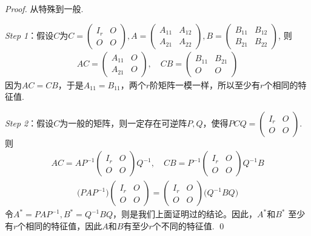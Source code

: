 \begin{proof}
	从特殊到一般.

	\emph{Step 1}：假设$C$为$C=\begin{pmatrix}
		I_r & O \\
		O & O
	\end{pmatrix}, A=\begin{pmatrix}
		A_{11} & A_{12} \\
		A_{21} & A_{22}
	\end{pmatrix}, B=\begin{pmatrix}
		B_{11} & B_{12} \\
		B_{21} & B_{22}
	\end{pmatrix}$,
	则
	\begin{align*}
	AC = \begin{pmatrix}
		A_{11} & O \\
		A_{21} & O
	\end{pmatrix}, \quad CB = \begin{pmatrix}
		B_{11} & B_{21} \\
		O & O
	\end{pmatrix}
	\end{align*}
	因为$AC=CB$，于是$A_{11} = B_{11}$，两个$r$阶矩阵一模一样，所以至少有$r$个相同的特征值.

	\emph{Step 2}：假设$C$为一般的矩阵，则一定存在可逆阵$P,Q$，使得$PCQ = \begin{pmatrix}
		I_r & O \\
		O & O
	\end{pmatrix}$.
	则
	\begin{align*}
		AC = A P^{-1} \begin{pmatrix}
			I_r & O \\
			O & O
		\end{pmatrix} Q^{-1}, \quad 
		CB = P^{-1} \begin{pmatrix}
			I_r & O \\
			O & O
		\end{pmatrix} Q^{-1} B
	\end{align*}
	\begin{align*}
		\bigl( P A P^{-1} \bigr) \begin{pmatrix}
			I_r & O \\
			O & O
		\end{pmatrix} = \begin{pmatrix}
			I_r & O \\
			O & O
		\end{pmatrix} \bigl( Q^{-1} B Q \bigr)
	\end{align*}
	令$A^\ast = P A P^{-1}, B^\ast = Q^{-1} B Q$，则是我们上面证明过的结论。因此，$A^\ast$和$B^\ast$
	至少有$r$个相同的特征值，因此$A$和$B$有至少$r$个不同的特征值. \qed{}
\end{proof}

